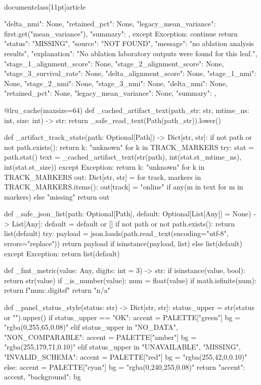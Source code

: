 \\documentclass[11pt]{article}
\begin{document}
\begin{CodeBlock}
{{                        "delta_nmi": None,
                        "retained_pct": None,
                        "legacy_mean_variance": first.get("mean_variance"),
                        "summary": {},
                    }
            except Exception:
                continue
    return {
        "status": "MISSING",
        "source": "NOT FOUND",
        "message": "no ablation analysis results",
        "explanation": "No ablation laboratory outputs were found for this leaf.",
        "stage_1_alignment_score": None,
        "stage_2_alignment_score": None,
        "stage_3_survival_rate": None,
        "delta_alignment_score": None,
        "stage_1_nmi": None,
        "stage_2_nmi": None,
        "stage_3_nmi": None,
        "delta_nmi": None,
        "retained_pct": None,
        "legacy_mean_variance": None,
        "summary": {},
    }


@lru_cache(maxsize=64)
def _cached_artifact_text(path_str: str, mtime_ns: int, size: int) -> str:
    return _safe_read_text(Path(path_str)).lower()


def _artifact_track_state(path: Optional[Path]) -> Dict[str, str]:
    if not path or not path.exists():
        return {k: "unknown" for k in TRACK_MARKERS}
    try:
        stat = path.stat()
        text = _cached_artifact_text(str(path), int(stat.st_mtime_ns), int(stat.st_size))
    except Exception:
        return {k: "unknown" for k in TRACK_MARKERS}
    out: Dict[str, str] = {}
    for track, markers in TRACK_MARKERS.items():
        out[track] = "online" if any(m in text for m in markers) else "missing"
    return out


def _safe_json_list(path: Optional[Path], default: Optional[List[Any]] = None) -> List[Any]:
    default = default or []
    if not path or not path.exists():
        return list(default)
    try:
        payload = json.loads(path.read_text(encoding="utf-8", errors="replace"))
        return payload if isinstance(payload, list) else list(default)
    except Exception:
        return list(default)


def _fmt_metric(value: Any, digits: int = 3) -> str:
    if isinstance(value, bool):
        return str(value)
    if _is_number(value):
        num = float(value)
        if math.isfinite(num):
            return f"{num:.{digits}f}"
    return "n/a"


def _panel_status_style(status: str) -> Dict[str, str]:
    status_upper = str(status or "").upper()
    if status_upper == "OK":
        accent = PALETTE["green"]
        bg = "rgba(0,255,65,0.08)"
    elif status_upper in {"NO_DATA", "NON_COMPARABLE"}:
        accent = PALETTE["amber"]
        bg = "rgba(255,179,71,0.10)"
    elif status_upper in {"UNAVAILABLE", "MISSING", "INVALID_SCHEMA"}:
        accent = PALETTE["red"]
        bg = "rgba(255,42,0,0.10)"
    else:
        accent = PALETTE["cyan"]
        bg = "rgba(0,240,255,0.08)"
    return {"accent": accent, "background": bg}


}
\end{CodeBlock}
\end{document}
